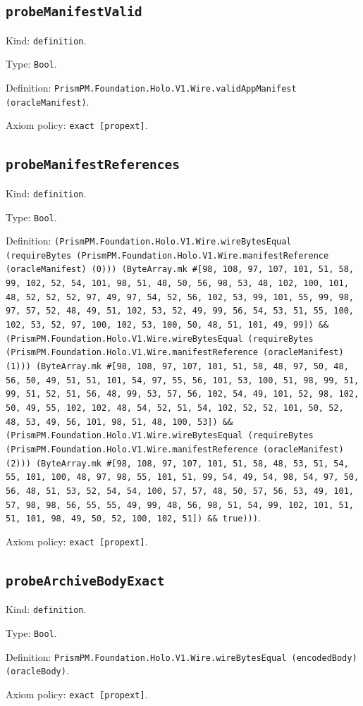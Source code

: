 \documentclass[11pt]{article}
\begin{document}
\subsection*{\texttt{probeManifestValid}}
\noindent Kind: \texttt{definition}.\par
\noindent Type: \texttt{Bool}.\par
\noindent Definition: \texttt{PrismPM.Foundation.Holo.V1.Wire.validAppManifest (oracleManifest)}.\par
\noindent Axiom policy: \texttt{exact [propext]}.\par
\subsection*{\texttt{probeManifestReferences}}
\noindent Kind: \texttt{definition}.\par
\noindent Type: \texttt{Bool}.\par
\noindent Definition: \texttt{(PrismPM.Foundation.Holo.V1.Wire.wireBytesEqual (requireBytes (PrismPM.Foundation.Holo.V1.Wire.manifestReference (oracleManifest) (0))) (ByteArray.mk \#[98, 108, 97, 107, 101, 51, 58, 99, 102, 52, 54, 101, 98, 51, 48, 50, 56, 98, 53, 48, 102, 100, 101, 48, 52, 52, 52, 97, 49, 97, 54, 52, 56, 102, 53, 99, 101, 55, 99, 98, 97, 57, 52, 48, 49, 51, 102, 53, 52, 49, 99, 56, 54, 53, 51, 55, 100, 102, 53, 52, 97, 100, 102, 53, 100, 50, 48, 51, 101, 49, 99]) \&\& (PrismPM.Foundation.Holo.V1.Wire.wireBytesEqual (requireBytes (PrismPM.Foundation.Holo.V1.Wire.manifestReference (oracleManifest) (1))) (ByteArray.mk \#[98, 108, 97, 107, 101, 51, 58, 48, 97, 50, 48, 56, 50, 49, 51, 51, 101, 54, 97, 55, 56, 101, 53, 100, 51, 98, 99, 51, 99, 51, 52, 51, 56, 48, 99, 53, 57, 56, 102, 54, 49, 101, 52, 98, 102, 50, 49, 55, 102, 102, 48, 54, 52, 51, 54, 102, 52, 52, 101, 50, 52, 48, 53, 49, 56, 101, 98, 51, 48, 100, 53]) \&\& (PrismPM.Foundation.Holo.V1.Wire.wireBytesEqual (requireBytes (PrismPM.Foundation.Holo.V1.Wire.manifestReference (oracleManifest) (2))) (ByteArray.mk \#[98, 108, 97, 107, 101, 51, 58, 48, 53, 51, 54, 55, 101, 100, 48, 97, 98, 55, 101, 51, 99, 54, 49, 54, 98, 54, 97, 50, 56, 48, 51, 53, 52, 54, 54, 100, 57, 57, 48, 50, 57, 56, 53, 49, 101, 57, 98, 98, 56, 55, 55, 49, 99, 48, 56, 98, 51, 54, 99, 102, 101, 51, 51, 101, 98, 49, 50, 52, 100, 102, 51]) \&\& true)))}.\par
\noindent Axiom policy: \texttt{exact [propext]}.\par
\subsection*{\texttt{probeArchiveBodyExact}}
\noindent Kind: \texttt{definition}.\par
\noindent Type: \texttt{Bool}.\par
\noindent Definition: \texttt{PrismPM.Foundation.Holo.V1.Wire.wireBytesEqual (encodedBody) (oracleBody)}.\par
\noindent Axiom policy: \texttt{exact [propext]}.\par
\end{document}

